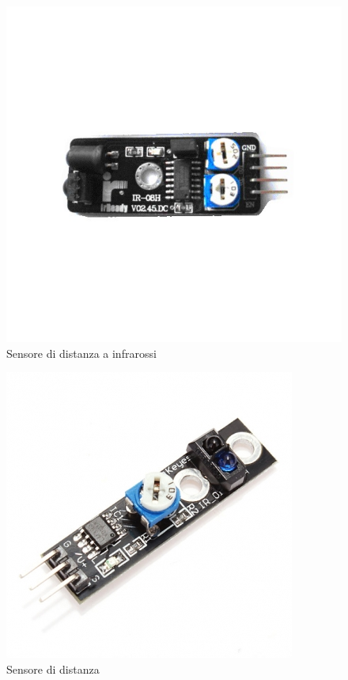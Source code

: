 \documentclass[a4paper,titlepage]{book}
\begin{document}
\begin{figure}[!h]
\centering
\includegraphics[scale=0.5]{dist1.jpg}
\caption{Sensore di distanza a infrarossi}
\end{figure}


\begin{figure}[!h]
\centering
\includegraphics[scale=0.5]{dist2.jpg}
\caption{Sensore di distanza}
\end{figure}
\end{document}
